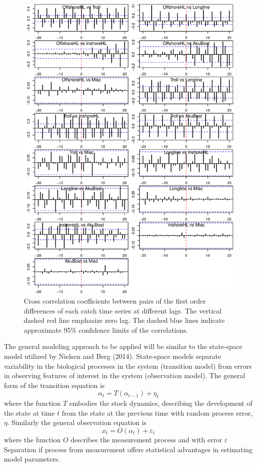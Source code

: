 \documentclass[12pt,letterpaper]{article}
\begin{document}
\begin{figure}
\begin{center}
\includegraphics[height=0.9\textheight]{./graphics/ccf.png}
\caption{\label{fig:catchCCF}
Cross correlation coefficients between pairs of the first order
differences of each catch time series at different lags.
The vertical dashed red line emphasize zero lag.
The dashed blue lines indicate approximate 95\% confidence limits of
the correlations.}
\end{center}
\end{figure}

The general modeling approach to be applied will be similar to the
state-space model utilized by Nielsen and Berg (2014). 
State-space models separate variability in the biological
processes in the system (transition model)
from errors in observing features of interest
in the system (observation model). 
The general form of the transition equation is
\begin{equation}
\alpha_t=T(\alpha_{t-1}) + \eta_t
\end{equation}
where the function $T$ embodies the stock dynamics, describing the
development of the state at time $t$ from the state at the previous
time with random process error, $\eta$.
Similarly the general observation equation is
\begin{equation}
x_t = O(\alpha_t) + \varepsilon_t
\end{equation}
where the function $O$ describes the measurement process and with
error $\varepsilon$
Separation if process from measurement offers statistical advantages in
estimating model parameters.
\end{document}

